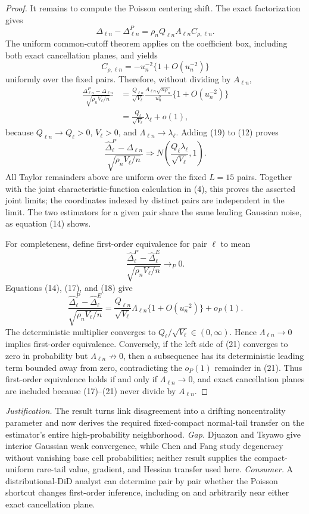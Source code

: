\documentclass{article}
\begin{document}
\begin{proof}
It remains to compute the Poisson centering shift. The exact factorization gives
\[
 \Delta_{\ell n}-\Delta^P_{\ell n}
 =\rho_nQ_{\ell n}A_{\ell n}C_{\rho,\ell n}.
\tag{17}
\]
The uniform common-cutoff theorem applies on the coefficient box, including both exact cancellation planes, and yields
\[
 C_{\rho,\ell n}=-u_n^{-2}\{1+O(u_n^{-2})\}
\tag{18}
\]
uniformly over the fixed pairs. Therefore, without dividing by \(A_{\ell n}\),
\[
 \begin{aligned}
 \frac{\Delta^P_{\ell n}-\Delta_{\ell n}}
 {\sqrt{\rho_nV_\ell/n}}
 &=\frac{Q_{\ell n}}{\sqrt{V_\ell}}
 \frac{A_{\ell n}\sqrt{n\rho_n}}{u_n^2}
 \{1+O(u_n^{-2})\}\\
 &=\frac{Q_\ell}{\sqrt{V_\ell}}\lambda_\ell+o(1),
 \end{aligned}
\tag{19}
\]
because \(Q_{\ell n}\to Q_\ell>0\), \(V_\ell>0\), and \(\Lambda_{\ell n}\to\lambda_\ell\). Adding (19) to (12) proves
\[
 \frac{\widehat\Delta^P_\ell-\Delta_{\ell n}}
 {\sqrt{\rho_nV_\ell/n}}
 \Rightarrow N\!\left(\frac{Q_\ell\lambda_\ell}{\sqrt{V_\ell}},1\right).
\tag{20}
\]
All Taylor remainders above are uniform over the fixed \(L=15\) pairs. Together with the joint characteristic-function calculation in (4), this proves the asserted joint limits; the coordinates indexed by distinct pairs are independent in the limit. The two estimators for a given pair share the same leading Gaussian noise, as equation (14) shows.

For completeness, define first-order equivalence for pair \(\ell\) to mean
\[
 \frac{\widehat\Delta^P_\ell-\widehat\Delta^E_\ell}
 {\sqrt{\rho_nV_\ell/n}}\longrightarrow_P0.
\]
Equations (14), (17), and (18) give
\[
 \frac{\widehat\Delta^P_\ell-\widehat\Delta^E_\ell}
 {\sqrt{\rho_nV_\ell/n}}
 =\frac{Q_{\ell n}}{\sqrt{V_\ell}}\Lambda_{\ell n}
 \{1+O(u_n^{-2})\}+o_P(1).
\tag{21}
\]
The deterministic multiplier converges to \(Q_\ell/\sqrt{V_\ell}\in(0,\infty)\). Hence \(\Lambda_{\ell n}\to0\) implies first-order equivalence. Conversely, if the left side of (21) converges to zero in probability but \(\Lambda_{\ell n}\not\to0\), then a subsequence has its deterministic leading term bounded away from zero, contradicting the \(o_P(1)\) remainder in (21). Thus first-order equivalence holds if and only if \(\Lambda_{\ell n}\to0\), and exact cancellation planes are included because (17)--(21) never divide by \(A_{\ell n}\).
\end{proof}
\par\smallskip\noindent \textit{Justification.} The result turns link disagreement into a drifting noncentrality parameter and now derives the required fixed-compact normal-tail transfer on the estimator's entire high-probability neighborhood. \textit{Gap.} Djuazon and Tsyawo give interior Gaussian weak convergence, while Chen and Fang study degeneracy without vanishing base cell probabilities; neither result supplies the compact-uniform rare-tail value, gradient, and Hessian transfer used here. \textit{Consumer.} A distributional-DiD analyst can determine pair by pair whether the Poisson shortcut changes first-order inference, including on and arbitrarily near either exact cancellation plane.
\end{document}
